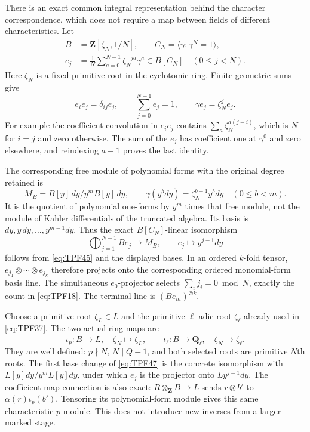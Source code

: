 There is an exact common integral representation
behind the character correspondence, which
does not require a map between fields of
different characteristics. Let
\[
 \begin{split}
 B&=\mathbf Z[\zeta_N,1/N],\qquad
 C_N=\langle\gamma:\gamma^N=1\rangle,\\
 e_j&=\frac1N\sum_{a=0}^{N-1}
                   \zeta_N^{-ja}\gamma^a
             \in B[C_N]\quad(0\le j<N).
 \end{split}
 \tag{TPF.44}\label{eq:TPF44}
\]
Here \(\zeta_N\) is a fixed primitive root in the
cyclotomic ring. Finite geometric sums give
\[
 e_ie_j=\delta_{ij}e_j,\qquad
 \sum_{j=0}^{N-1}e_j=1,\qquad
 \gamma e_j=\zeta_N^j e_j .
 \tag{TPF.45}\label{eq:TPF45}
\]
For example the coefficient convolution in
\(e_ie_j\) contains
\(\sum_a\zeta_N^{a(j-i)}\), which is \(N\)
for \(i=j\) and zero otherwise. The sum of
the \(e_j\) has coefficient one at
\(\gamma^0\) and zero elsewhere, and
reindexing \(a+1\) proves the last identity.

The corresponding free module of polynomial
forms with the original degree retained is
\[
 M_B=B[y]\,dy/y^mB[y]\,dy,\qquad
 \gamma(y^bdy)=\zeta_N^{b+1}y^bdy
                      \quad(0\le b<m).
 \tag{TPF.46}\label{eq:TPF46}
\]
It is the quotient of polynomial one-forms
by \(y^m\) times that free module, not the
module of Kahler differentials of the
truncated algebra. Its basis is
\(dy,y\,dy,\ldots,y^{m-1}dy\).
Thus the exact \(B[C_N]\)-linear isomorphism
\[
 \bigoplus_{j=1}^{N-1}B e_j
       \longrightarrow M_B,\qquad
 e_j\longmapsto y^{j-1}dy
 \tag{TPF.47}\label{eq:TPF47}
\]
follows from \eqref{eq:TPF45} and the displayed
bases. In an ordered \(k\)-fold tensor,
\(e_{j_1}\otimes\cdots\otimes e_{j_k}\)
therefore projects onto the corresponding
ordered monomial-form basis line. The
simultaneous \(e_0\)-projector selects
\(\sum_i j_i=0\bmod N\), exactly the count
in \eqref{eq:TPF18}. The terminal line is
\((B e_m)^{\otimes k}\).

Choose a primitive root \(\zeta_L\in L\)
and the primitive \(\ell\)-adic root
\(\zeta_\ell\) already used in
\eqref{eq:TPF37}. The two actual ring maps are
\[
 \iota_p:B\to L,\quad\zeta_N\mapsto\zeta_L,
 \qquad
 \iota_\ell:B\to\overline{\mathbf Q}_\ell,\quad
                  \zeta_N\mapsto\zeta_\ell .
 \tag{TPF.48}\label{eq:TPF48}
\]
They are well defined: \(p\nmid N\),
\(N\mid Q-1\), and both selected roots are
primitive \(N\)th roots. The first base
change of \eqref{eq:TPF47} is the concrete
isomorphism with
\(L[y]dy/y^mL[y]dy\), under which
\(e_j\) is the projector onto
\(L y^{j-1}dy\).
The coefficient-map connection is also exact:
\(R\otimes_{\mathbf Z}B\to L\) sends
\(r\otimes b'\) to \(\alpha(r)\iota_p(b')\).
Tensoring its polynomial-form module gives
this same characteristic-\(p\) module.
This does not introduce new inverses from
a larger marked stage.

